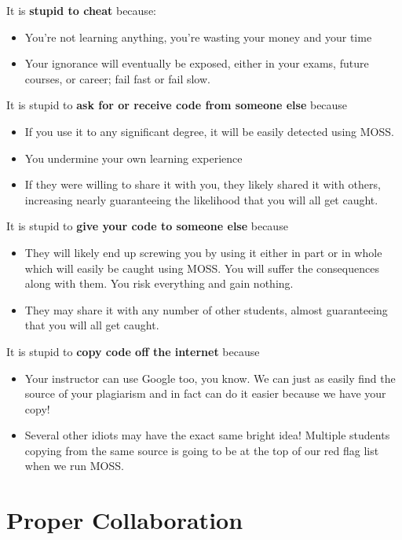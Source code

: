 \documentclass[12pt]{scrartcl}
\begin{document}
It is \textbf{stupid to cheat} because:
\begin{itemize}
  \item You're not learning anything, you're wasting your money and your time 
  \item Your ignorance will eventually be exposed, either in your exams, future courses, or career; fail fast or fail slow.
\end{itemize}

It is stupid to \textbf{ask for or receive code from someone else} because
\begin{itemize}
  \item If you use it to any significant degree, it will be easily detected using MOSS.
  \item You undermine your own learning experience
  \item If they were willing to share it with you, they likely shared it with others, increasing nearly guaranteeing the likelihood that you will all get caught.
\end{itemize}

It is stupid to \textbf{give your code to someone else} because
\begin{itemize}
  \item They will likely end up screwing you by using it either in part or in whole which will easily be caught using MOSS.  You will suffer the consequences along with them.  You risk everything and gain nothing.
  \item They may share it with any number of other students, almost guaranteeing that you will all get caught.
\end{itemize}

It is stupid to \textbf{copy code off the internet} because
\begin{itemize}
  \item Your instructor can use Google too, you know.  We can just as easily find the source of your plagiarism and in fact can do it easier because we have your copy!
  \item Several other idiots may have the exact same bright idea!  Multiple students copying from the same source is going to be at the top of our red flag list when we run MOSS.
\end{itemize}

\section*{Proper Collaboration}
\end{document}
